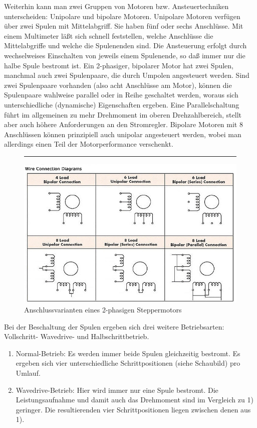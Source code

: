 \begin{description}[leftmargin=3cm]
							\item[Ansteuerung \& Anschluss]
							Weiterhin kann man zwei Gruppen von Motoren bzw. Ansteuertechniken unterscheiden: Unipolare und bipolare Motoren. Unipolare Motoren verfügen über zwei Spulen mit Mittelabgriff. Sie haben fünf oder sechs Anschlüsse. Mit einem Multimeter läßt sich schnell feststellen, welche Anschlüsse die Mittelabgriffe und welche die Spulenenden sind. Die Ansteuerung erfolgt durch wechselweises Einschalten von jeweils einem Spulenende, so daß immer nur die halbe Spule bestromt ist.
							Ein 2-phasiger, bipolarer Motor hat zwei Spulen, manchmal auch zwei Spulenpaare, die durch Umpolen angesteuert werden. Sind zwei Spulenpaare vorhanden (also acht Anschlüsse am Motor), können die Spulenpaare wahlweise parallel oder in Reihe geschaltet werden, woraus sich unterschiedliche (dynamische) Eigenschaften ergeben. Eine Parallelschaltung führt im allgemeinen zu mehr Drehmoment im oberen Drehzahlbereich, stellt aber auch höhere Anforderungen an den Stromregler. Bipolare Motoren mit 8 Anschlüssen können prinzipiell auch unipolar angesteuert werden, wobei man allerdings einen Teil der Motorperformance verschenkt.
							\begin{figure}[h]
								\centering \rule{1.5cm}{0cm}
								\includegraphics[width=0.7\linewidth]{./pics/el/unibipolar}
								\caption{Anschlussvarianten eines 2-phasigen Steppermotors}
							\end{figure} 
							Bei der Beschaltung der Spulen ergeben sich drei weitere Betriebsarten: Vollschritt- Wavedrive- und Halbschrittbetrieb.
							\begin{enumerate}
								\item Normal-Betrieb: Es werden immer beide Spulen gleichzeitig bestromt. Es ergeben sich vier unterschiedliche Schrittpositionen (siehe Schaubild) pro Umlauf.
								\item Wavedrive-Betrieb: Hier wird immer nur eine Spule bestromt. Die Leistungsaufnahme und damit auch das Drehmoment sind im Vergleich zu 1) geringer. Die resultierenden vier Schrittpositionen liegen zwischen denen aus 1).

\end{enumerate}
\end{description}
